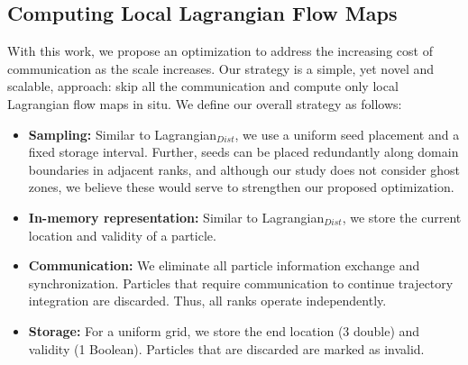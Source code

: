 \subsection{Computing Local Lagrangian Flow Maps}
%
%
%
%
%
With this work, we propose an optimization to address the increasing cost of communication as the scale increases.
%
Our strategy is a simple, yet novel and scalable, approach: skip all the communication and compute only local Lagrangian flow maps in situ. 
%
We define our overall strategy as follows:
\begin{itemize}[leftmargin=*]
\item\textbf{Sampling:} Similar to Lagrangian$_{Dist}$, we use a uniform seed placement and a fixed storage interval.
%
Further, seeds can be placed redundantly along domain boundaries in adjacent ranks, and although our study does not consider ghost zones, we believe these would serve to strengthen our proposed optimization.
%
\item\textbf{In-memory representation:} Similar to Lagrangian$_{Dist}$, we store the current location and validity of a particle.
%
\item\textbf{Communication:} We eliminate all particle information exchange and synchronization. Particles that require communication to continue trajectory integration are discarded. Thus, all ranks operate independently.
%
\item\textbf{Storage:} For a uniform grid, we store the end location (3 double) and validity (1 Boolean). Particles that are discarded are marked as invalid. 
%
\end{itemize}

